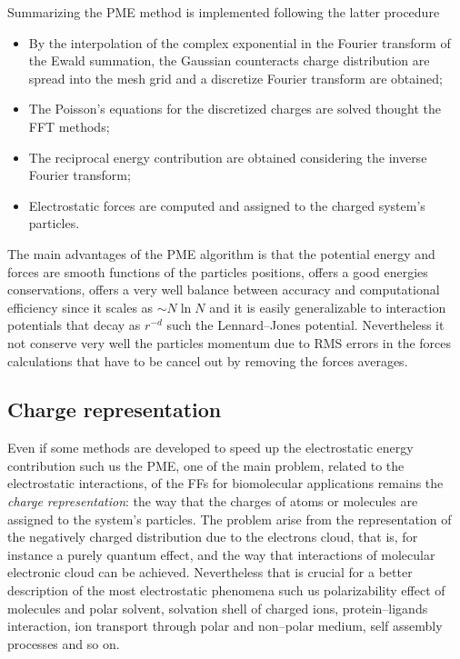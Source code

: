 Summarizing the \ac{PME} method is implemented following the latter procedure
\begin{itemize}
	\item By the interpolation of the complex exponential in the Fourier transform of the Ewald summation, the Gaussian counteracts charge distribution are spread into the mesh grid and a discretize Fourier transform are obtained;
	\item The Poisson's equations for the discretized charges are solved thought the \ac{FFT} methods;
	\item The reciprocal energy contribution are obtained considering the inverse Fourier transform;
	\item Electrostatic forces are computed and assigned to the charged system's particles.
\end{itemize}
The main advantages of the \ac{PME} algorithm is that the potential energy and forces are smooth functions of the particles positions, offers a good energies conservations, offers a very well balance between accuracy and computational efficiency since it scales as $\sim N\ln N$ and it is easily generalizable to interaction potentials that decay as $r^{-d}$ such the Lennard--Jones potential. Nevertheless it not conserve very well the particles momentum due to \ac{RMS} errors in the forces calculations that have to be cancel out by removing the forces averages.

\subsection{Charge representation}
\label{sec:chargeRep}
Even if some methods are developed to speed up the electrostatic energy contribution such us the \ac{PME}, one of the main problem, related to the electrostatic interactions, of the \acp{FF} for biomolecular applications remains the \textit{charge representation}: the way that the charges of atoms or molecules are assigned to the system's particles. The problem arise from the representation of the negatively charged distribution due to the electrons cloud, that is, for instance a purely quantum effect, and the way that interactions of molecular electronic cloud can be achieved. Nevertheless that is crucial for a better description of the most electrostatic phenomena such us polarizability effect of molecules and polar solvent, solvation shell of charged ions, protein--ligands interaction, ion transport through polar and non--polar medium, self assembly processes and so on.

